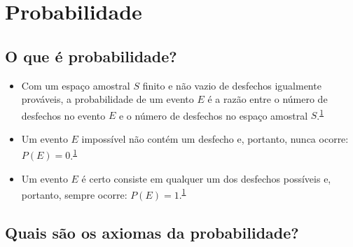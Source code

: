 \documentclass[
  a4paper,
]{book}
\begin{document}
\hypertarget{probabilidade}{%
\section{Probabilidade}\label{probabilidade}}

\hypertarget{o-que-uxe9-probabilidade}{%
\subsection{O que é probabilidade?}\label{o-que-uxe9-probabilidade}}

\begin{itemize}
\item
  Com um espaço amostral \(S\) finito e não vazio de desfechos igualmente prováveis, a probabilidade de um evento \(E\) é a razão entre o número de desfechos no evento \(E\) e o número de desfechos no espaço amostral \(S\).\textsuperscript{\protect\hyperlink{ref-grami2023}{1}}
\item
  Um evento \(E\) impossível não contém um desfecho e, portanto, nunca ocorre: \(P(E)=0\).\textsuperscript{\protect\hyperlink{ref-grami2023}{1}}
\item
  Um evento \(E\) é certo consiste em qualquer um dos desfechos possíveis e, portanto, sempre ocorre: \(P(E)=1\).\textsuperscript{\protect\hyperlink{ref-grami2023}{1}}
\end{itemize}

\hypertarget{quais-suxe3o-os-axiomas-da-probabilidade}{%
\subsection{Quais são os axiomas da probabilidade?}\label{quais-suxe3o-os-axiomas-da-probabilidade}}
\end{document}

